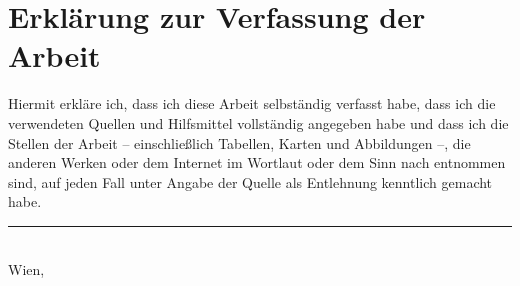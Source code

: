 
\section*{Erkl\"arung zur Verfassung der Arbeit}

\vspace*{3ex}

\noindent
Hiermit erkl\"are ich, dass ich diese Arbeit selbst\"andig verfasst habe, dass ich die verwendeten Quellen und Hilfsmittel vollst\"andig angegeben habe und dass ich die Stellen der Arbeit -- einschließlich Tabellen, Karten und Abbildungen --, die anderen Werken oder dem Internet im Wortlaut oder dem Sinn nach entnommen sind, auf jeden Fall unter Angabe der Quelle als Entlehnung kenntlich gemacht habe.\\[5ex]

\noindent
\rule{8cm}{.5pt} \\
Wien, \spdate \\
\studname
